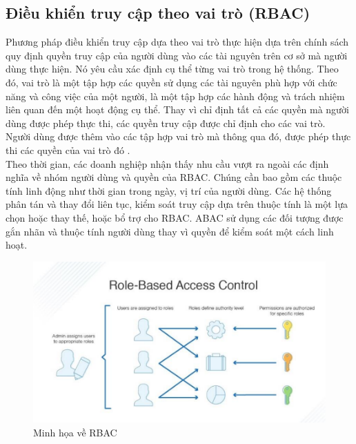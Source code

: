 \subsection{Điều khiển truy cập theo vai trò (RBAC)}
Phương pháp điều khiển truy cập dựa theo vai trò thực hiện dựa trên chính sách
quy định quyền truy cập của người dùng vào các tài nguyên trên cơ sở mà người dùng
thực hiện. Nó yêu cầu xác định cụ thể từng vai trò trong hệ thống. Theo đó, vai trò là
một tập hợp các quyền sử dụng các tài nguyên phù hợp với chức năng và công việc của
một người, là một tập hợp các hành động và trách nhiệm liên quan đến một hoạt động
cụ thể. Thay vì chỉ định tất cả các quyền mà người dùng được phép thực thi, các quyền
truy cập được chỉ định cho các vai trò. Người dùng được thêm vào các tập hợp vai trò
mà thông qua đó, được phép thực thi các quyền của vai trò đó \cite{hu2006assessment}. \\
\indent Theo thời gian, các doanh nghiệp nhận thấy nhu cầu vượt ra ngoài các định nghĩa
về nhóm người dùng và quyền của RBAC. Chúng cần bao gồm các thuộc tính linh động
như thời gian trong ngày, vị trí của người dùng. Các hệ thống phân tán và thay đổi liên
tục, kiểm soát truy cập dựa trên thuộc tính là một lựa chọn hoặc thay thế, hoặc bổ trợ
cho RBAC. ABAC sử dụng các đối tượng được gắn nhãn và thuộc tính người dùng thay
vì quyền để kiểm soát một cách linh hoạt.
\begin{figure}
    \centering
    \includegraphics[scale=0.7]{graphics/chapter-2/chap2-rbac.png}
    \caption{Minh họa về RBAC}
    \label{fig:enter-label}
\end{figure}
